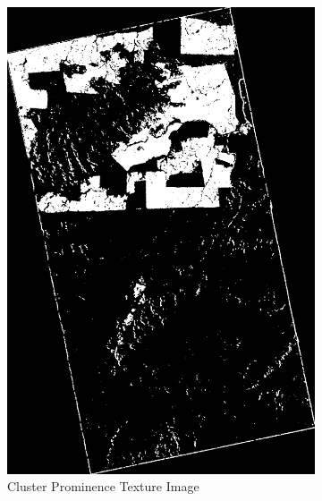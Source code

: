 \begin{figure}
    \centering
    \begin{subfigure}[b]{0.4\linewidth}
      \includegraphics[width=\linewidth]{Cap3-Results/sum_and_diff_textures/cluster_prominenceimage.png}
       \caption{Cluster Prominence Texture Image}
    \end{subfigure}
    \centering
    \begin{subfigure}[b]{0.4\linewidth}

\end{subfigure}
\end{figure}

